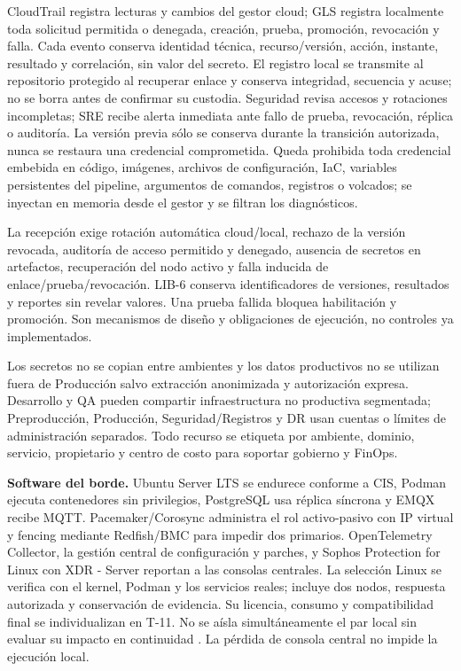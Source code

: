 CloudTrail registra lecturas y cambios del gestor cloud; GLS registra localmente toda solicitud permitida o denegada, creación, prueba, promoción, revocación y falla. Cada evento conserva identidad técnica, recurso/versión, acción, instante, resultado y correlación, sin valor del secreto. El registro local se transmite al repositorio protegido al recuperar enlace y conserva integridad, secuencia y acuse; no se borra antes de confirmar su custodia. Seguridad revisa accesos y rotaciones incompletas; SRE recibe alerta inmediata ante fallo de prueba, revocación, réplica o auditoría. La versión previa sólo se conserva durante la transición autorizada, nunca se restaura una credencial comprometida. Queda prohibida toda credencial embebida en código, imágenes, archivos de configuración, IaC, variables persistentes del pipeline, argumentos de comandos, registros o volcados; se inyectan en memoria desde el gestor y se filtran los diagnósticos.

La recepción exige rotación automática cloud/local, rechazo de la versión revocada, auditoría de acceso permitido y denegado, ausencia de secretos en artefactos, recuperación del nodo activo y falla inducida de enlace/prueba/revocación. LIB-6 conserva identificadores de versiones, resultados y reportes sin revelar valores. Una prueba fallida bloquea habilitación y promoción. Son mecanismos de diseño y obligaciones de ejecución, no controles ya implementados. \parencite[RT-04.09, p.~11]{pucv-transversal}

Los secretos no se copian entre ambientes y los datos productivos no se utilizan fuera de Producción salvo extracción anonimizada y autorización expresa. Desarrollo y QA pueden compartir infraestructura no productiva segmentada; Preproducción, Producción, Seguridad/Registros y DR usan cuentas o límites de administración separados. Todo recurso se etiqueta por ambiente, dominio, servicio, propietario y centro de costo para soportar gobierno y FinOps.

\textbf{Software del borde.} Ubuntu Server LTS se endurece conforme a CIS, Podman ejecuta contenedores sin privilegios, PostgreSQL usa réplica síncrona y EMQX recibe MQTT. Pacemaker/Corosync administra el rol activo-pasivo con IP virtual y fencing mediante Redfish/BMC para impedir dos primarios. OpenTelemetry Collector, la gestión central de configuración y parches, y Sophos Protection for Linux con XDR - Server reportan a las consolas centrales. La selección Linux se verifica con el kernel, Podman y los servicios reales; incluye dos nodos, respuesta autorizada y conservación de evidencia. Su licencia, consumo y compatibilidad final se individualizan en T-11. No se aísla simultáneamente el par local sin evaluar su impacto en continuidad \parencites{p3-sophos-linux,p3-sophos-rtd}. La pérdida de consola central no impide la ejecución local.

